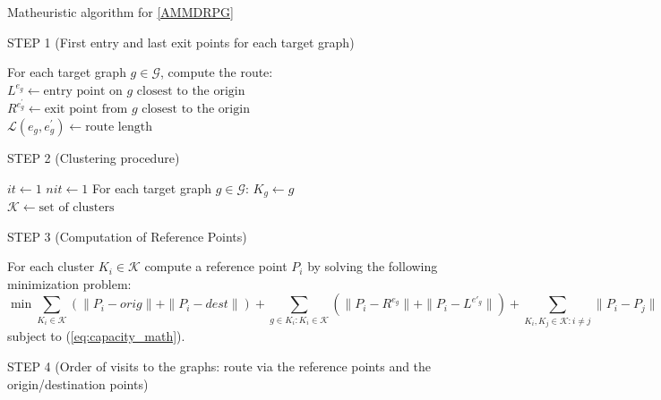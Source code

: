 \begin{algorithm}
\caption{Matheuristic algorithm for \ref{AMMDRPG}}\label{alg:math}

STEP 1 (First entry and last exit points for each target graph)\\
\begin{algorithmic}
\State For each target graph $g \in \mathcal{G}$, compute the route:\\
 $ L^{e_{g}} \gets \mbox{entry point on $g$ closest to the origin}$\\
 $R^{e^{'}_{g}} \gets \mbox{exit point from $g$ closest to the origin}$\\
 $\mathcal L(e_{g}, e^{'}_{g}) \gets \mbox{route length}$
\end{algorithmic}
STEP 2 (Clustering procedure)
\begin{algorithmic}
\State $it \gets 1$
\State $nit \gets 1$
\State For each target graph $g \in \mathcal{G}$:\;
$K_g \gets g$ \\
$\mathcal K \gets \mbox{set of clusters}$
\end{algorithmic}
STEP 3 (Computation of Reference Points) 
\begin{algorithmic}
\State For each cluster $K_i \in \mathcal K$\;
compute a reference point $P_i$ by solving the following minimization problem:
$$
\min \sum_{K_i \in \mathcal K}( \|P_i - orig\| + \|P_i - dest \|) + \sum_{g \in K_i: K_i \in \mathcal K} (\|P_i - R^{e_g} \| + \| P_i - L^{e'_g}\|) + \sum_{K_i, K_j \in \mathcal K: i \neq j} \|P_i - P_j\|
$$
subject to (\ref{eq:capacity_math}).
\end{algorithmic}
STEP 4 (Order of visits to the graphs: route via the reference points and the origin/destination points)

\end{algorithm}
